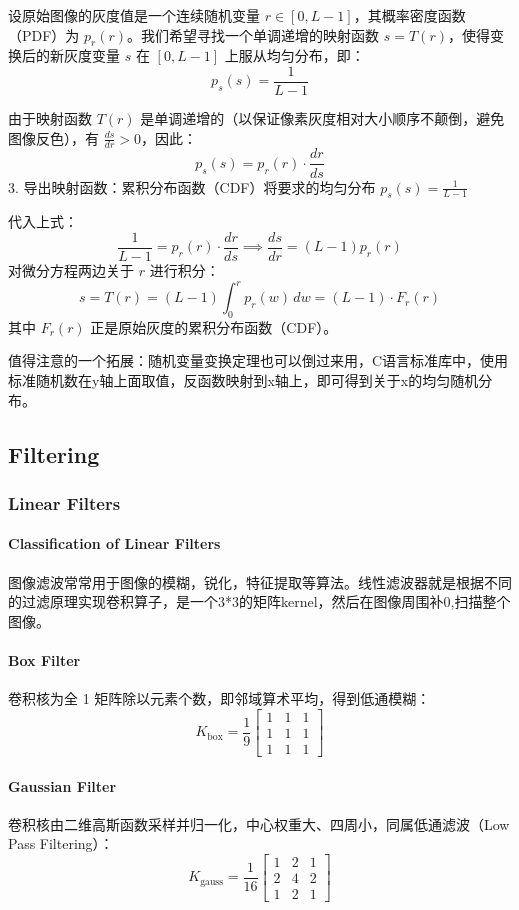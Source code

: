 设原始图像的灰度值是一个连续随机变量 $r \in [0, L-1]$，其概率密度函数（PDF）为 $p_r(r)$。我们希望寻找一个单调递增的映射函数 $s = T(r)$，使得变换后的新灰度变量 $s$ 在 $[0, L-1]$ 上服从均匀分布，即：$$p_s(s) = \frac{1}{L-1}$$

由于映射函数 $T(r)$ 是单调递增的（以保证像素灰度相对大小顺序不颠倒，避免图像反色），有 $\frac{ds}{dr} > 0$，因此：$$p_s(s) = p_r(r) \cdot \frac{dr}{ds}$$3. 导出映射函数：累积分布函数（CDF）将要求的均匀分布 $p_s(s) = \frac{1}{L-1}$ 

代入上式：$$\frac{1}{L-1} = p_r(r) \cdot \frac{dr}{ds} \implies \frac{ds}{dr} = (L-1) p_r(r)$$对微分方程两边关于 $r$ 进行积分：$$s = T(r) = (L-1) \int_0^r p_r(w) \, dw = (L-1) \cdot F_r(r)$$其中 $F_r(r)$ 正是原始灰度的累积分布函数（CDF）。

值得注意的一个拓展：随机变量变换定理也可以倒过来用，C语言标准库中，使用标准随机数在y轴上面取值，反函数映射到x轴上，即可得到关于x的均匀随机分布。

\subsection{Filtering}

\subsubsection{Linear Filters}
\paragraph{Classification of Linear Filters}
图像滤波常常用于图像的模糊，锐化，特征提取等算法。线性滤波器就是根据不同的过滤原理实现卷积算子，是一个3*3的矩阵kernel，然后在图像周围补0,扫描整个图像。
\paragraph{Box Filter}
卷积核为全 1 矩阵除以元素个数，即邻域算术平均，得到低通模糊：
$$K_{\text{box}} = \frac{1}{9}\begin{bmatrix} 1 & 1 & 1 \\ 1 & 1 & 1 \\ 1 & 1 & 1 \end{bmatrix}$$

\paragraph{Gaussian Filter}
卷积核由二维高斯函数采样并归一化，中心权重大、四周小，同属低通滤波（Low Pass Filtering）：
$$K_{\text{gauss}} = \frac{1}{16}\begin{bmatrix} 1 & 2 & 1 \\ 2 & 4 & 2 \\ 1 & 2 & 1 \end{bmatrix}$$

